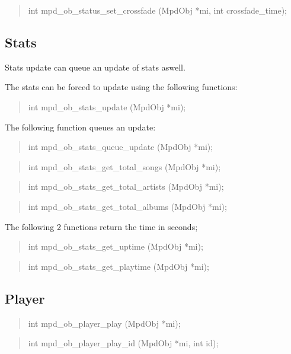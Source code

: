 \documentclass[a4paper,11pt]{article}
\begin{document}
\begin{quote}
int  mpd\_ob\_status\_set\_crossfade  (MpdObj *mi, int crossfade\_time);
\end{quote}

\subsection {Stats}


Stats update can queue an update of stats aswell.

The stats can be forced to update using the following functions:

\begin{quote}
int  mpd\_ob\_stats\_update   (MpdObj *mi);
\end{quote}

The following function queues an update:
\begin{quote}
int  mpd\_ob\_stats\_queue\_update  (MpdObj *mi);
\end{quote}

\begin{quote}
int  mpd\_ob\_stats\_get\_total\_songs  (MpdObj *mi);
\end{quote}

\begin{quote}
int  mpd\_ob\_stats\_get\_total\_artists  (MpdObj *mi);
\end{quote}

\begin{quote}
int  mpd\_ob\_stats\_get\_total\_albums  (MpdObj *mi);
\end{quote}

The following 2 functions return the time in seconds;
\begin{quote}
int  mpd\_ob\_stats\_get\_uptime   (MpdObj *mi);
\end{quote}
\begin{quote}
int  mpd\_ob\_stats\_get\_playtime  (MpdObj *mi);
\end{quote}

\subsection{Player}
\begin{quote}
int   mpd\_ob\_player\_play   (MpdObj *mi);
\end{quote}
\begin{quote}
int   mpd\_ob\_player\_play\_id   (MpdObj *mi, int id);
\end{quote}
\end{document}
